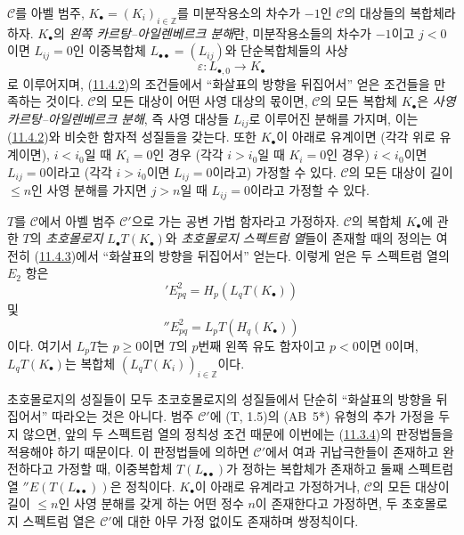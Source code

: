 \begin{env}[11.6.1]
\label{0.11.6.1-fr}
$\mathcal C$를 아벨 범주,
$K_\bullet=(K_i)_{i\in\mathbb Z}$를 미분작용소의 차수가 $-1$인
$\mathcal C$의 대상들의 복합체라 하자. $K_\bullet$의
\emph{왼쪽 카르탕--아일렌베르크 분해}란, 미분작용소들의 차수가
$-1$이고 $j<0$이면 $L_{ij}=0$인 이중복합체
$L_{\bullet\bullet}=(L_{ij})$와 단순복합체들의 사상
\[
\varepsilon:L_{\bullet,0}\to K_\bullet
\]
로 이루어지며, (\hyperref[0.11.4.2-fr]{11.4.2})의 조건들에서
``화살표의 방향을 뒤집어서'' 얻은 조건들을 만족하는 것이다.
$\mathcal C$의 모든 대상이 어떤 사영 대상의 몫이면,
$\mathcal C$의 모든 복합체 $K_\bullet$은
\emph{사영 카르탕--아일렌베르크 분해}, 즉 사영 대상들 $L_{ij}$로
이루어진 분해를 가지며, 이는
(\hyperref[0.11.4.2-fr]{11.4.2})와 비슷한 함자적 성질들을 갖는다.
또한 $K_\bullet$이 아래로 유계이면 (각각 위로 유계이면),
$i<i_0$일 때 $K_i=0$인 경우 (각각 $i>i_0$일 때 $K_i=0$인 경우)
$i<i_0$이면 $L_{ij}=0$이라고 (각각 $i>i_0$이면
$L_{ij}=0$이라고) 가정할 수 있다. $\mathcal C$의 모든 대상이
길이 $\leq n$인 사영 분해를 가지면 $j>n$일 때 $L_{ij}=0$이라고
가정할 수 있다.
\end{env}

\begin{env}[11.6.2]
\label{0.11.6.2-fr}
$T$를 $\mathcal C$에서 아벨 범주 $\mathcal C'$으로 가는 공변 가법
함자라고 가정하자. $\mathcal C$의 복합체 $K_\bullet$에 관한
$T$의 \emph{초호몰로지} $L_\bullet T(K_\bullet)$와
\emph{초호몰로지 스펙트럼 열}들이 존재할 때의 정의는 여전히
(\hyperref[0.11.4.3-fr]{11.4.3})에서 ``화살표의 방향을
뒤집어서'' 얻는다. 이렇게 얻은 두 스펙트럼 열의 $E_2$ 항은
\[
\label{0.11.6.2.1-fr}
\tag{11.6.2.1}
{}'E^2_{pq}=H_p(L_qT(K_\bullet))
\]
및
\[
\label{0.11.6.2.2-fr}
\tag{11.6.2.2}
{}''E^2_{pq}=L_pT(H_q(K_\bullet))
\]
이다. 여기서 $L_pT$는 $p\geq0$이면 $T$의 $p$번째 왼쪽 유도
함자이고 $p<0$이면 $0$이며, $L_qT(K_\bullet)$는 복합체
$(L_qT(K_i))_{i\in\mathbb Z}$이다.

초호몰로지의 성질들이 모두 초코호몰로지의 성질들에서 단순히
``화살표의 방향을 뒤집어서'' 따라오는 것은 아니다. 범주
$\mathcal C'$에 (T, 1.5)의 (AB~5*) 유형의 추가 가정을 두지 않으면,
앞의 두 스펙트럼 열의 정칙성 조건 때문에 이번에는
(\hyperref[0.11.3.4-fr]{11.3.4})의 판정법들을 적용해야 하기
때문이다. 이 판정법들에 의하면 $\mathcal C'$에서 여과 귀납극한들이
존재하고 완전하다고 가정할 때, 이중복합체
$T(L_{\bullet\bullet})$가 정하는 복합체가 존재하고 둘째 스펙트럼 열
${}''E(T(L_{\bullet\bullet}))$은 정칙이다. $K_\bullet$이 아래로
유계라고 가정하거나, $\mathcal C$의 모든 대상이 길이 $\leq n$인
사영 분해를 갖게 하는 어떤 정수 $n$이 존재한다고 가정하면, 두
초호몰로지 스펙트럼 열은 $\mathcal C'$에 대한 아무 가정 없이도
존재하며 쌍정칙이다.
\end{env}

